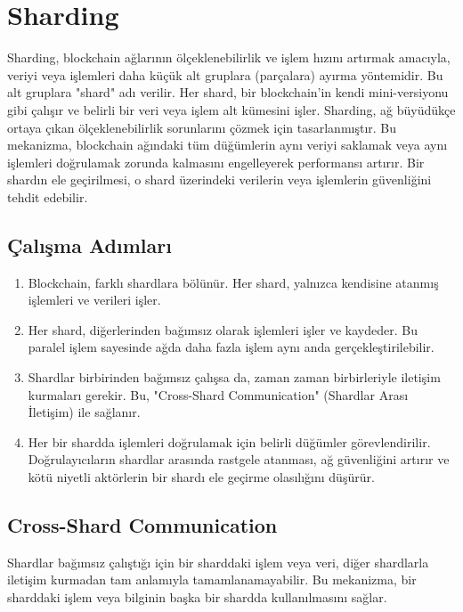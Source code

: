 \section{Sharding}

Sharding, blockchain ağlarının ölçeklenebilirlik ve işlem hızını artırmak amacıyla, veriyi veya işlemleri daha küçük alt gruplara (parçalara) ayırma yöntemidir. Bu alt gruplara "shard" adı verilir. Her shard, bir blockchain'in kendi mini-versiyonu gibi çalışır ve belirli bir veri veya işlem alt kümesini işler. Sharding, ağ büyüdükçe ortaya çıkan ölçeklenebilirlik sorunlarını çözmek için tasarlanmıştır. Bu mekanizma, blockchain ağındaki tüm düğümlerin aynı veriyi saklamak veya aynı işlemleri doğrulamak zorunda kalmasını engelleyerek performansı artırır. Bir shardın ele geçirilmesi, o shard üzerindeki verilerin veya işlemlerin güvenliğini tehdit edebilir.

\subsection{Çalışma Adımları}

\begin{enumerate}
    \item Blockchain, farklı shardlara bölünür. Her shard, yalnızca kendisine atanmış işlemleri ve verileri işler.
    \item Her shard, diğerlerinden bağımsız olarak işlemleri işler ve kaydeder. Bu paralel işlem sayesinde ağda daha fazla işlem aynı anda gerçekleştirilebilir.
    \item Shardlar birbirinden bağımsız çalışsa da, zaman zaman birbirleriyle iletişim kurmaları gerekir. Bu, "Cross-Shard Communication" (Shardlar Arası İletişim) ile sağlanır.
    \item Her bir shardda işlemleri doğrulamak için belirli düğümler görevlendirilir. Doğrulayıcıların shardlar arasında rastgele atanması, ağ güvenliğini artırır ve kötü niyetli aktörlerin bir shardı ele geçirme olasılığını düşürür.
\end{enumerate}

\subsection{Cross-Shard Communication}

Shardlar bağımsız çalıştığı için bir sharddaki işlem veya veri, diğer shardlarla iletişim kurmadan tam anlamıyla tamamlanamayabilir. Bu mekanizma, bir sharddaki işlem veya bilginin başka bir shardda kullanılmasını sağlar. 

